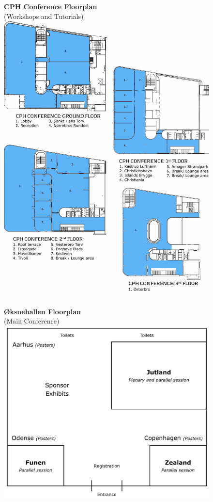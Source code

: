 \begin{figure}[p]
\centering
\textbf{CPH Conference Floorplan}\\
(Workshops and Tutorials)
\vspace{3em}
\includegraphics[width=\textwidth]{content/fmatter/floorplan_DGI_w_grid.pdf}
\end{figure}

\begin{figure}[p]
\centering
\textbf{Øksnehallen Floorplan}\\
(Main Conference)
\vspace{10em}
\includegraphics[width=\textwidth]{content/fmatter/floorplan_oeksnehallen.png}
\end{figure}
